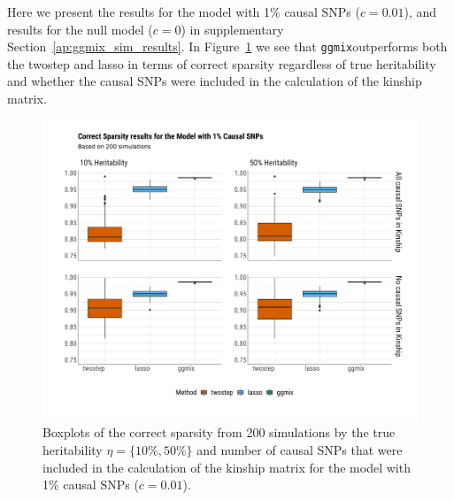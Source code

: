 \documentclass[12pt,letter]{article}\usepackage[]{graphicx}\usepackage[]{color}
\newenvironment{knitrout}{}{} %
\newcommand{\ggmix}{\texttt{ggmix}}
\begin{document}
Here we present the results for the model with 1\% causal SNPs ($c=0.01$), and results for the null model ($c=0$) in supplementary Section~\ref{ap:ggmix_sim_results}. In Figure~\ref{fig:plot-correct-sparsity-sim-1p-causal} we see that \ggmix outperforms both the twostep and lasso in terms of correct sparsity regardless of true heritability and whether the causal SNPs were included in the calculation of the kinship matrix. %

\begin{knitrout}\scriptsize
{}\color{fgcolor}\begin{figure}[h]

{\centering \includegraphics[width=1\linewidth]{figure/plot-correct-sparsity-sim-1p-causal-1} 

}

\caption[Boxplots of the correct sparsity from 200 simulations by the true heritability $\eta = \lbrace 10\%, 50\% \rbrace$ and number of causal SNPs that were included in the calculation of the kinship matrix for the model with 1\% causal SNPs ($c=0.01$)]{Boxplots of the correct sparsity from 200 simulations by the true heritability $\eta = \lbrace 10\%, 50\% \rbrace$ and number of causal SNPs that were included in the calculation of the kinship matrix for the model with 1\% causal SNPs ($c=0.01$).}\label{fig:plot-correct-sparsity-sim-1p-causal}
\end{figure}


\end{knitrout}
\end{document}
